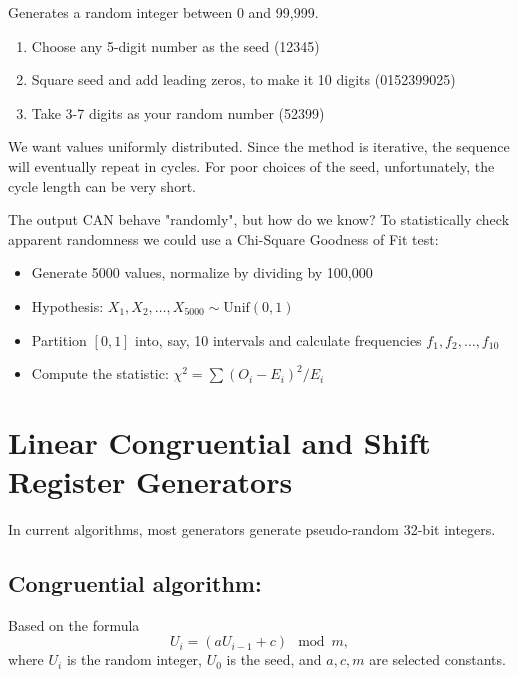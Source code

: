 \documentclass[11pt,english]{scrbook}
\begin{document}
Generates a random integer between 0 and 99,999.

\begin{enumerate}
\item Choose any 5-digit number as the seed (12345)
\item Square seed and add leading zeros, to make it 10 digits (0152399025)
\item Take 3-7 digits as your random number (52399)
\end{enumerate}

We want values uniformly distributed. Since the method is iterative, the sequence will eventually repeat in cycles. For poor choices of the seed, unfortunately, the cycle length can be very short.

The output CAN behave "randomly", but how do we know? To statistically check apparent randomness we could use a Chi-Square Goodness of Fit test:
\begin{itemize}
\item Generate 5000 values, normalize by dividing by 100,000
\item Hypothesis: \(X_{1},X_{2},\ldots,X_{5000}\sim\mathrm{Unif}(0,1)\)
\item Partition \([0,1]\) into, say, 10 intervals and calculate frequencies \(f_{1},f_{2},\ldots,f_{10}\)
\item Compute the statistic: \(\chi^{2}=\sum(O_{i}-E_{i})^{2}/E_{i}\)
\end{itemize}

\section{Linear Congruential and Shift Register Generators}
\label{sec:orga18f1fc}

In current algorithms, most generators generate pseudo-random 32-bit integers.  

\subsection{Congruential algorithm:}
\label{sec:orge599325}
Based on the formula 
\[
U_{i}=(aU_{i-1}+c)\mod m,
\]
where \(U_{i}\) is the random integer, \(U_{0}\) is the seed, and \(a,c,m\) are selected constants.
\end{document}
